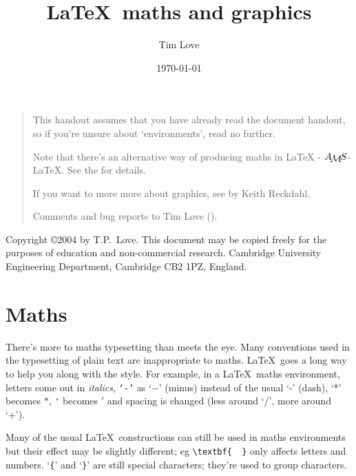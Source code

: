 \documentclass[dvips]{article}
\newcommand{\AmS}{${\protect\the\textfont2 A}\kern-.1667em\lower
         .5ex\hbox{\protect\the\textfont2 M}\kern
         -.125em{\protect\the\textfont2 S}$}
\newcommand{\AmSLaTeX}{\mbox{\AmS-\LaTeX}}
\begin{document}
\title{\LaTeX\ maths and graphics}
\author{Tim Love}
\date{\today}
\maketitle

\begin{quotation}
This handout assumes that you have already read the 
document handout, so if you're unsure about `environments', read no further.

Note that there's an alternative way of producing maths in \LaTeX{} - 
 \AmSLaTeX{}. See the 
 for details.

If you want to more more about graphics, see   by Keith Reckdahl.  

Comments and bug reports to Tim Love (). 
\end{quotation}

\begin{table}[b]
Copyright \copyright 2004 by T.P.~Love.
This document may be copied freely for the purposes 
of education and non-commercial research.
Cambridge University Engineering Department,  
Cambridge CB2 1PZ, England.
\end{table}


\tableofcontents



\section{Maths}
There's more to maths typesetting than meets the eye. Many conventions
used in the typesetting of plain text are inappropriate to maths. \LaTeX\ 
goes a long way to help you along with the style. For example,
in a \LaTeX\ maths environment, letters come out in {\it italics}, \texttt{`-'}
as `$-$' (minus) instead of the usual `-' (dash), `*' becomes $*$,
\verb|'| becomes $'$ and spacing is 
changed (less around `/', more around `+').

Many of the usual \LaTeX\ constructions can still be used in maths environments
but their effect may be slightly different; eg \verb|\textbf{  }| only affects letters 
and numbers. `\verb|{|' and  `\verb|}|' are still special characters;
they're used to group characters.
\end{document}
